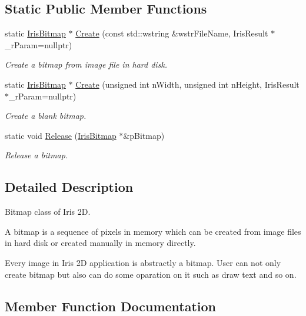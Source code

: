 \subsection*{Static Public Member Functions}
\begin{DoxyCompactItemize}
\item 
static \hyperlink{class_iris2_d_1_1_iris_bitmap}{Iris\+Bitmap} $\ast$ \hyperlink{class_iris2_d_1_1_iris_bitmap_ac9d31fd83b64c4051e1474eb7322442f}{Create} (const std\+::wstring \&wstr\+File\+Name, Iris\+Result $\ast$\+\_\+r\+Param=nullptr)
\begin{DoxyCompactList}\small\item\em Create a bitmap from image file in hard disk. \end{DoxyCompactList}\item 
static \hyperlink{class_iris2_d_1_1_iris_bitmap}{Iris\+Bitmap} $\ast$ \hyperlink{class_iris2_d_1_1_iris_bitmap_a42a6c58440df5bb965a2d299cd3620e4}{Create} (unsigned int n\+Width, unsigned int n\+Height, Iris\+Result $\ast$\+\_\+r\+Param=nullptr)
\begin{DoxyCompactList}\small\item\em Create a blank bitmap. \end{DoxyCompactList}\item 
static void \hyperlink{class_iris2_d_1_1_iris_bitmap_a30f09c40ae048de40f06c0a1d6575441}{Release} (\hyperlink{class_iris2_d_1_1_iris_bitmap}{Iris\+Bitmap} $\ast$\&p\+Bitmap)
\begin{DoxyCompactList}\small\item\em Release a bitmap. \end{DoxyCompactList}\end{DoxyCompactItemize}


\subsection{Detailed Description}
Bitmap class of Iris 2D. 

A bitmap is a sequence of pixels in memory which can be created from image files in hard disk or created manually in memory directly.

Every image in Iris 2D application is abstractly a bitmap. User can not only create bitmap but also can do some oparation on it such as draw text and so on. 

\subsection{Member Function Documentation}
\mbox{\label{class_iris2_d_1_1_iris_bitmap_ac9d31fd83b64c4051e1474eb7322442f}} 
